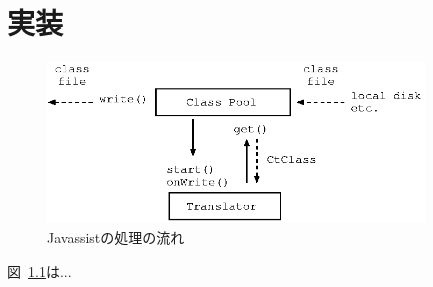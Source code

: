\chapter{実装}

\begin{figure}[tb]
 \begin{center}
  \includegraphics[width=10cm]{javassist.eps}
  \caption{Javassistの処理の流れ}
  \label{fig:javassist}
 \end{center}
\end{figure}

図~\ref{fig:javassist}は...

